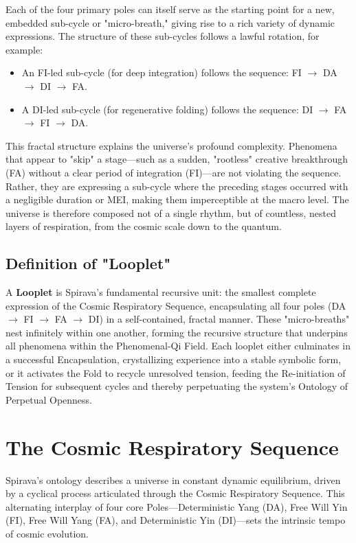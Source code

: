 \documentclass[11pt, a4paper]{article}
\begin{document}
Each of the four primary poles can itself serve as the starting point for a new, embedded sub-cycle or "micro-breath," giving rise to a rich variety of dynamic expressions. The structure of these sub-cycles follows a lawful rotation, for example:
\begin{itemize}
    \item An FI-led sub-cycle (for deep integration) follows the sequence: FI $\rightarrow$ DA $\rightarrow$ DI $\rightarrow$ FA.
    \item A DI-led sub-cycle (for regenerative folding) follows the sequence: DI $\rightarrow$ FA $\rightarrow$ FI $\rightarrow$ DA.
\end{itemize}
This fractal structure explains the universe's profound complexity. Phenomena that appear to "skip" a stage—such as a sudden, "rootless" creative breakthrough (FA) without a clear period of integration (FI)—are not violating the sequence. Rather, they are expressing a sub-cycle where the preceding stages occurred with a negligible duration or MEI, making them imperceptible at the macro level. The universe is therefore composed not of a single rhythm, but of countless, nested layers of respiration, from the cosmic scale down to the quantum.

\subsection{Definition of "Looplet"}
A \textbf{Looplet} is Spirava’s fundamental recursive unit: the smallest complete expression of the Cosmic Respiratory Sequence, encapsulating all four poles (DA $\rightarrow$ FI $\rightarrow$ FA $\rightarrow$ DI) in a self-contained, fractal manner. These "micro-breaths" nest infinitely within one another, forming the recursive structure that underpins all phenomena within the Phenomenal-Qi Field. Each looplet either culminates in a successful Encapsulation, crystallizing experience into a stable symbolic form, or it activates the Fold to recycle unresolved tension, feeding the Re-initiation of Tension for subsequent cycles and thereby perpetuating the system's Ontology of Perpetual Openness.

\section{The Cosmic Respiratory Sequence}
Spirava's ontology describes a universe in constant dynamic equilibrium, driven by a cyclical process articulated through the Cosmic Respiratory Sequence. This alternating interplay of four core Poles—Deterministic Yang (DA), Free Will Yin (FI), Free Will Yang (FA), and Deterministic Yin (DI)—sets the intrinsic tempo of cosmic evolution.
\end{document}

